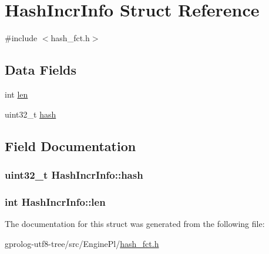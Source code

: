 \hypertarget{structHashIncrInfo}{}\section{Hash\+Incr\+Info Struct Reference}
\label{structHashIncrInfo}


{\ttfamily \#include $<$hash\+\_\+fct.\+h$>$}

\subsection*{Data Fields}
\begin{DoxyCompactItemize}
\item 
int \hyperlink{structHashIncrInfo_adab7e9365193be88c2bb9e65edbf63bb}{len}
\item 
uint32\+\_\+t \hyperlink{structHashIncrInfo_a3f0d935d1523af0164e99832740c7df7}{hash}
\end{DoxyCompactItemize}


\subsection{Field Documentation}
\subsubsection[{\texorpdfstring{hash}{hash}}]{\setlength{\rightskip}{0pt plus 5cm}uint32\+\_\+t Hash\+Incr\+Info\+::hash}\hypertarget{structHashIncrInfo_a3f0d935d1523af0164e99832740c7df7}{}\label{structHashIncrInfo_a3f0d935d1523af0164e99832740c7df7}
\subsubsection[{\texorpdfstring{len}{len}}]{\setlength{\rightskip}{0pt plus 5cm}int Hash\+Incr\+Info\+::len}\hypertarget{structHashIncrInfo_adab7e9365193be88c2bb9e65edbf63bb}{}\label{structHashIncrInfo_adab7e9365193be88c2bb9e65edbf63bb}


The documentation for this struct was generated from the following file\+:\begin{DoxyCompactItemize}
\item 
gprolog-\/utf8-\/tree/src/\+Engine\+Pl/\hyperlink{hash__fct_8h}{hash\+\_\+fct.\+h}\end{DoxyCompactItemize}
